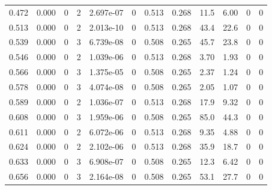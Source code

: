 \documentclass[preview]{standalone}
\begin{document}
{{\begin{tabular}{L{1.2cm}C{1.2cm} C{0.3cm}C{0.5cm} C{1.4cm}C{1.4cm} C{1.4cm}C{1.4cm} C{1.6cm}C{1.6cm} C{1.6cm}C{1.6cm}}
  0.472  &  0.000  & 0     &  2 &  2.697e-07  & 0  &  0.513&   0.268& 11.5 & 6.00   &  0 & 0  \\ 
  0.513  &  0.000  & 0     &  2 &  2.013e-10  & 0  &  0.513&   0.268& 43.4 & 22.6   &  0 & 0  \\ 
  0.539  &  0.000  & 0     &  3 &  6.739e-08  & 0  &  0.508&   0.265& 45.7 & 23.8   &  0 & 0  \\ 
  0.546  &  0.000  & 0     &  2 &  1.039e-06  & 0  &  0.513&   0.268& 3.70 & 1.93   &  0 & 0  \\ 
  0.566  &  0.000  & 0     &  3 &  1.375e-05  & 0  &  0.508&   0.265& 2.37 & 1.24   &  0 & 0  \\ 
  0.578  &  0.000  & 0     &  3 &  4.074e-08  & 0  &  0.508&   0.265& 2.05 & 1.07   &  0 & 0  \\ 
  0.589  &  0.000  & 0     &  2 &  1.036e-07  & 0  &  0.513&   0.268& 17.9 & 9.32   &  0 & 0  \\ 
  0.608  &  0.000  & 0     &  3 &  1.959e-06  & 0  &  0.508&   0.265& 85.0 & 44.3   &  0 & 0  \\ 
  0.611  &  0.000  & 0     &  2 &  6.072e-06  & 0  &  0.513&   0.268& 9.35 & 4.88   &  0 & 0  \\ 
  0.624  &  0.000  & 0     &  2 &  2.102e-06  & 0  &  0.513&   0.268& 35.9 & 18.7   &  0 & 0  \\ 
  0.633  &  0.000  & 0     &  3 &  6.908e-07  & 0  &  0.508&   0.265& 12.3 & 6.42   &  0 & 0  \\ 
  0.656  &  0.000  & 0     &  3 &  2.164e-08  & 0  &  0.508&   0.265& 53.1 & 27.7   &  0 & 0  \\ 
\hline 
\end{tabular} 

}}
\end{document}
